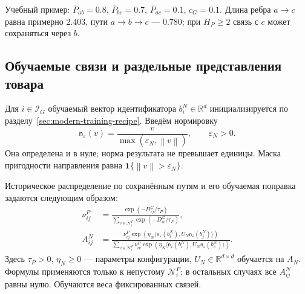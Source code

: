 \documentclass[12pt,a4paper]{article}
\newcommand{\R}{\mathbb R}
\newcommand{\ind}{\mathbf 1}
\newcommand{\eps}{\varepsilon}
\newcommand{\norm}[1]{\left\lVert#1\right\rVert}
\theoremstyle{plainru}
\begin{document}
Учебный пример: $\bar P_{ab}=0.8$, $\bar P_{bc}=0.7$,
$\bar P_{ac}=0.1$, $c_G=0.1$. Длина ребра $a\to c$ равна примерно
$2.403$, пути $a\to b\to c$ --- $0.780$; при $H_P\ge2$
связь с $c$ может сохраняться через $b$.

\subsection{Обучаемые связи и раздельные представления товара}
\label{sec:modern-item}

Для $i\in\mathcal I_G$ обучаемый вектор идентификатора $b_i^N\in\R^d$
инициализируется по разделу~\ref{sec:modern-training-recipe}. Введём нормировку
\begin{equation}\label{eq:modern-normalize}
\mathsf n_\eps(v)=\frac{v}{\max(\eps_N,\norm{v})},\qquad\eps_N>0.
\end{equation}
Она определена и в нуле; норма результата не превышает единицы.
Маска пригодности направления равна $\ind\{\norm{v}>\eps_N\}$.

Историческое распределение по сохранённым путям и его обучаемая
поправка задаются следующим образом:
\begin{align}\label{eq:modern-edge-attention}
\nu_{ij}^{P}
&=\frac{\exp(-D_{ij}^{G}/\tau_P)}
{\sum_{v\in\mathcal N_i^P}\exp(-D_{iv}^{G}/\tau_P)},\\
A_{ij}^{N}
&=\frac{\nu_{ij}^{P}\exp(\eta_N\langle
\mathsf n_\eps(b_i^N),U_N\mathsf n_\eps(b_j^N)\rangle)}
{\sum_{v\in\mathcal N_i^P}\nu_{iv}^{P}\exp(\eta_N\langle
\mathsf n_\eps(b_i^N),U_N\mathsf n_\eps(b_v^N)\rangle)}.
\nonumber
\end{align}
Здесь $\tau_P>0$, $\eta_N\ge0$ --- параметры конфигурации,
$U_N\in\R^{d\times d}$ обучается на $A_N$.
Формулы применяются только к непустому $\mathcal N_i^P$;
в остальных случаях все $A_{ij}^{N}$ равны нулю.
Обучаются веса фиксированных связей.
\end{document}
